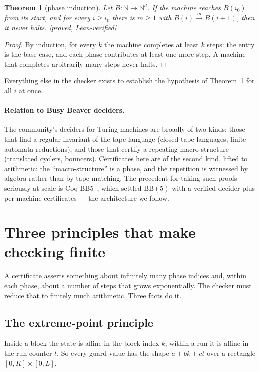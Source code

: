 \documentclass[11pt,a4paper]{article}
\theoremstyle{plain}
\newtheorem{theorem}{Theorem}[section]
\theoremstyle{definition}
\newcommand{\Lean}{\textcolor{linkc}{\textsf{[proved, Lean-verified]}}}
\begin{document}
\begin{theorem}[phase induction]\label{thm:A}
Let $B : \mathbb{N} \to \mathbb{N}^d$. If the machine reaches $B(i_0)$
from its start, and for every $i \ge i_0$ there is $m \ge 1$ with
$B(i) \xrightarrow{m} B(i+1)$, then it never halts. \Lean
\end{theorem}
\begin{proof}
By induction, for every $k$ the machine completes at least $k$ steps: the
entry is the base case, and each phase contributes at least one more
step. A machine that completes arbitrarily many steps never halts.
\end{proof}

Everything else in the checker exists to establish the hypothesis of
Theorem~\ref{thm:A} for all $i$ at once.

\paragraph{Relation to Busy Beaver deciders.} The community's deciders for
Turing machines are broadly of two kinds: those that find a regular
invariant of the tape language (closed tape languages, finite-automata
reductions), and those that certify a repeating macro-structure
(translated cyclers, bouncers). Certificates here are of the second kind,
lifted to arithmetic: the ``macro-structure'' is a phase, and the
repetition is witnessed by algebra rather than by tape matching. The
precedent for taking such proofs seriously at scale is
Coq-BB5~\cite{coqbb5}, which settled $\mathrm{BB}(5)$ with a verified
decider plus per-machine certificates --- the architecture we follow.

\section{Three principles that make checking finite}\label{sec:three}

A certificate asserts something about infinitely many phase indices and,
within each phase, about a number of steps that grows exponentially. The
checker must reduce that to finitely much arithmetic. Three facts do it.

\subsection{The extreme-point principle}

Inside a block the state is affine in the block index $k$; within a run it
is affine in the run counter $t$. So every guard value has the shape
$a + bk + ct$ over a rectangle $[0,K] \times [0,L]$.
\end{document}
